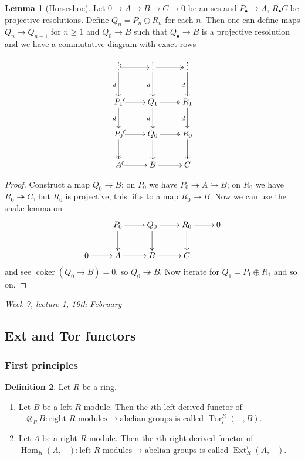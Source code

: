 \documentclass{article}
\newcommand{\Hom}{\operatorname{Hom}}
\newcommand{\coker}{\operatorname{coker}}
\newcommand{\Tor}{\operatorname{Tor}}
\newcommand{\Ext}{\operatorname{Ext}}
\theoremstyle{definition}
\newtheorem{defn}{Definition}[subsection]
\newtheorem{lemma}[defn]{Lemma}
\begin{document}
\begin{lemma}[Horseshoe]
Let $0\rightarrow A\rightarrow B\rightarrow C\rightarrow 0$ be an ses and $P_\bullet\rightarrow A$, $R_\bullet C$ be projective resolutions. Define $Q_n=P_n\oplus R_n$ for each $n$. Then one can define maps $Q_n\rightarrow Q_{n-1}$ for $n\geq 1$ and $Q_0\rightarrow B$ such that $Q_\bullet\rightarrow B$ is a projective resolution and we have a commutative diagram with exact rows
\[
\xymatrix{
\vdots \ar@{^{(}->}[r]\ar[d]_d& \vdots \ar@{->>}[r]\ar[d]_d& \vdots \ar[d]_d \\
P_1\ar@{^{(}->}[r]\ar[d]_d & Q_1\ar@{->>}[r]\ar[d]_d & R_1\ar[d]_d \\
P_0\ar@{^{(}->}[r]\ar@{->>}[d] & Q_0\ar@{->>}[r]\ar[d] & R_0\ar@{->>}[d] \\
A\ar@{^{(}->}[r] & B\ar[r] & C
}
\]
\end{lemma}
\begin{proof}
Construct a map $Q_0\rightarrow B$: on $P_0$ we have $P_0\twoheadrightarrow A\hookrightarrow B$; on $R_0$ we have $R_0\twoheadrightarrow C$, but $R_0$ is projective, this lifts to a map $R_0\rightarrow B$. Now we can use the snake lemma on
\[
\xymatrix{
& P_0\ar[r]\ar[d] & Q_0\ar[r]\ar[d] & R_0\ar[r]\ar[d] & 0 \\
0\ar[r] & A\ar[r] & B \ar[r] & C
}
\]
and see $\coker(Q_0\rightarrow B)=0$, so $Q_0\twoheadrightarrow B$. Now iterate for $Q_1=P_1\oplus R_1$ and so on.
\end{proof}

\begin{flushright}
\textit{Week 7, lecture 1, 19th February}
\end{flushright}

\subsection{Ext and Tor functors}
\subsubsection{First principles}
\begin{defn}
Let $R$ be a ring.
\begin{enumerate}
\item Let $B$ be a left $R$-module. Then the $i$th left derived functor of $-\otimes_RB:\text{right }R\text{-modules}\rightarrow\text{abelian groups}$ is called $\Tor_i^R(-,B)$.
\item Let $A$ be a right $R$-module. Then the $i$th right derived functor of $\Hom_R(A,-):\text{left }R\text{-modules}\rightarrow\text{abelian groups}$ is called $\Ext_R^i(A,-)$.
\end{enumerate}
\end{defn}
\end{document}
